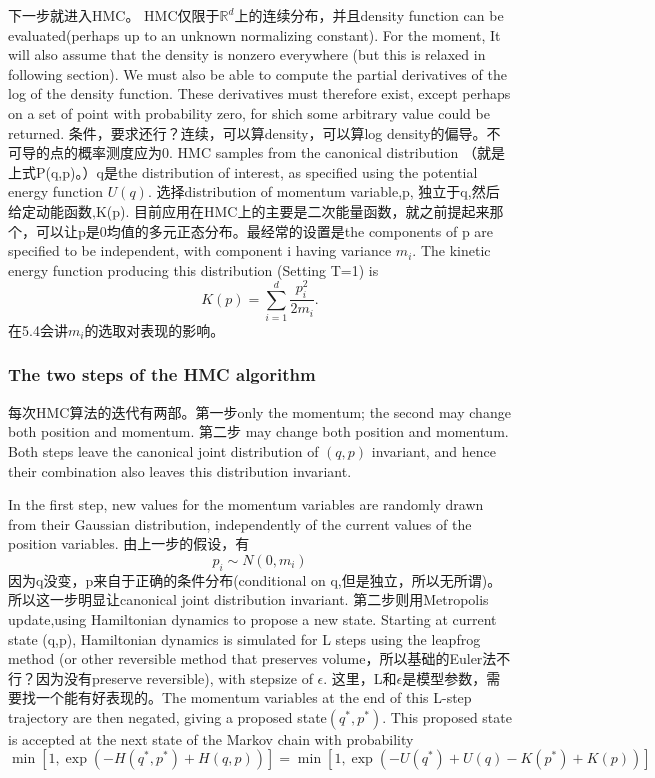 \documentclass[
]{book}
\theoremstyle{definition}
\theoremstyle{definition}
\theoremstyle{definition}
\theoremstyle{remark}
\begin{document}
下一步就进入HMC。
HMC仅限于\(\mathbb R^d\)上的连续分布，并且density function can be evaluated(perhaps up to an unknown normalizing constant). For the moment, It will also assume that the density is nonzero everywhere (but this is relaxed in following section). We must also be able to compute the partial derivatives of the log of the density function. These derivatives must therefore exist, except perhaps on a set of point with probability zero, for shich some arbitrary value could be returned.
条件，要求还行？连续，可以算density，可以算log density的偏导。不可导的点的概率测度应为0.
HMC samples from the canonical distribution （就是上式P(q,p)。）q是the distribution of interest, as specified using the potential energy function \(U(q)\). 选择distribution of momentum variable,p, 独立于q,然后给定动能函数,K(p). 目前应用在HMC上的主要是二次能量函数，就之前提起来那个，可以让p是0均值的多元正态分布。最经常的设置是the components of p are specified to be independent, with component i having variance \(m_i\). The kinetic energy function producing this distribution (Setting T=1) is
\[
K(p)=\sum_{i=1}^{d} \frac{p_{i}^{2}}{2 m_{i}}.
\]
在5.4会讲\(m_i\)的选取对表现的影响。

\hypertarget{the-two-steps-of-the-hmc-algorithm}{%
\subsubsection{The two steps of the HMC algorithm}\label{the-two-steps-of-the-hmc-algorithm}}

每次HMC算法的迭代有两部。第一步only the momentum; the second may change both position and momentum. 第二步 may change both position and momentum. Both steps leave the canonical joint distribution of \((q,p)\) invariant, and hence their combination also leaves this distribution invariant.

In the first step, new values for the momentum variables are randomly drawn from their Gaussian distribution, independently of the current values of the position variables. 由上一步的假设，有
\[
p_i\sim N(0,m_i)
\]
因为q没变，p来自于正确的条件分布(conditional on q,但是独立，所以无所谓)。所以这一步明显让canonical joint distribution invariant.
第二步则用Metropolis update,using Hamiltonian dynamics to propose a new state. Starting at current state (q,p), Hamiltonian dynamics is simulated for L steps using the leapfrog method (or other reversible method that preserves volume，所以基础的Euler法不行？因为没有preserve reversible), with stepsize of \(\epsilon\). 这里，L和\(\epsilon\)是模型参数，需要找一个能有好表现的。The momentum variables at the end of this L-step trajectory are then negated, giving a proposed state\((q^*,p^*)\). This proposed state is accepted at the next state of the Markov chain with probability
\[
\min \left[1, \exp \left(-H\left(q^{*}, p^{*}\right)+H(q, p)\right)\right]=\min \left[1, \exp \left(-U\left(q^{*}\right)+U(q)-K\left(p^{*}\right)+K(p)\right)\right]
\]
\end{document}
